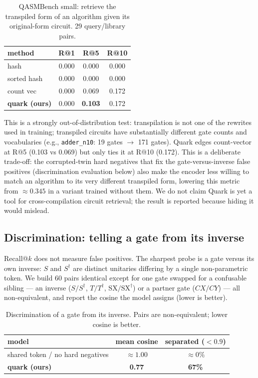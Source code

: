 \documentclass[11pt]{article}
\begin{document}
\begin{table}[h]
\centering
\begin{tabular}{lccc}
\toprule
method & R@1 & R@5 & R@10 \\
\midrule
hash & 0.000 & 0.000 & 0.000 \\
sorted hash & 0.000 & 0.000 & 0.000 \\
count vec & 0.000 & 0.069 & 0.172 \\
\textbf{quark (ours)} & 0.000 & \textbf{0.103} & 0.172 \\
\bottomrule
\end{tabular}
\caption{QASMBench small: retrieve the transpiled form of an algorithm given its original-form circuit. 29 query/library pairs.}
\end{table}

This is a strongly out-of-distribution test: transpilation is not one of the rewrites used in training; transpiled circuits have substantially different gate counts and vocabularies (e.g., \texttt{adder\_n10}: 19 gates $\rightarrow$ 171 gates). Quark edges count-vector at R@5 (0.103 vs 0.069) but only ties it at R@10 (0.172). This is a deliberate trade-off: the corrupted-twin hard negatives that fix the gate-versus-inverse false positives (discrimination evaluation below) also make the encoder less willing to match an algorithm to its very different transpiled form, lowering this metric from $\approx 0.345$ in a variant trained without them. We do not claim Quark is yet a tool for cross-compilation circuit retrieval; the result is reported because hiding it would mislead.

\subsection{Discrimination: telling a gate from its inverse}

Recall@$k$ does not measure false positives. The sharpest probe is a gate versus its own inverse: $S$ and $S^\dagger$ are distinct unitaries differing by a single non-parametric token. We build 60 pairs identical except for one gate swapped for a confusable sibling --- an inverse ($S/S^\dagger$, $T/T^\dagger$, $\mathrm{SX}/\mathrm{SX}^\dagger$) or a partner gate ($CX/CY$) --- all non-equivalent, and report the cosine the model assigns (lower is better).

\begin{table}[h]
\centering
\begin{tabular}{lcc}
\toprule
model & mean cosine & separated ($<0.9$) \\
\midrule
shared token / no hard negatives & $\approx 1.00$ & $\approx 0\%$ \\
\textbf{quark (ours)} & \textbf{0.77} & \textbf{67\%} \\
\bottomrule
\end{tabular}
\caption{Discrimination of a gate from its inverse. Pairs are non-equivalent; lower cosine is better.}
\end{table}
\end{document}
